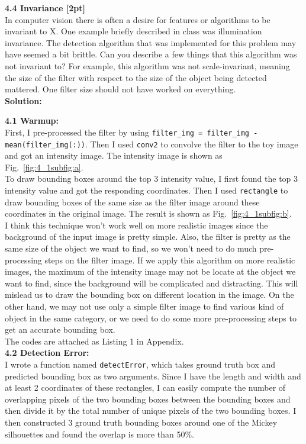 \documentclass{assignment}
\begin{document}
\begin{problemlist}
\textbf{4.4 Invariance [2pt]}\\
In computer vision there is often a desire for features or algorithms to be invariant to X. One example briefly described in class was illumination invariance. The detection algorithm that was implemented for this problem may have seemed a bit brittle. Can you describe a few things that this algorithm was not invariant to? For example, this algorithm was not scale-invariant, meaning the size of the filter with respect to the size of the object being detected mattered. One filter size should not have worked on everything.\\

\textbf{Solution:}

\textbf{4.1 Warmup:}\\
First, I pre-processed the filter by using \texttt{filter\_img = filter\_img - mean(filter\_img(:))}. Then I used \texttt{conv2} to convolve the filter to the toy image and got an intensity image. The intensity image is shown as Fig.~\ref{fig:4_1subfig:a}.\\
To draw bounding boxes around the top 3 intensity value, I first found the top 3 intensity value and got the responding coordinates. Then I used \texttt{rectangle} to draw bounding boxes of the same size as the filter image around these coordinates in the original image. The result is shown as Fig.~\ref{fig:4_1subfig:b}.\\
I think this technique won't work well on more realistic images since the background of the input image is pretty simple. Also, the filter is pretty as the same size of the object we want to find, so we won't need to do much pre-processing steps on the filter image. If we apply this algorithm on more realistic images, the maximum of the intensity image may not be locate at the object we want to find, since the background will be complicated and distracting. This will mislead us to draw the bounding box on different location in the image. On the other hand, we may not use only a simple filter image to find various kind of object in the same category, or we need to do some more pre-processing steps to get an accurate bounding box.\\

The codes are attached as Listing 1 in Appendix.\\

\textbf{4.2 Detection Error:}\\
I wrote a function named \texttt{detectError}, which takes ground truth box and predicted bounding box as two arguments. Since I have the length and width and at least 2 coordinates of these rectangles, I can easily compute the number of overlapping pixels of the two bounding boxes between the bounding boxes and then divide it by the total number of unique pixels of the two bounding boxes.
I then constructed 3 ground truth bounding boxes around one of the Mickey silhouettes and found the overlap is more than 50\%.\\


\end{problemlist}
\end{document}
